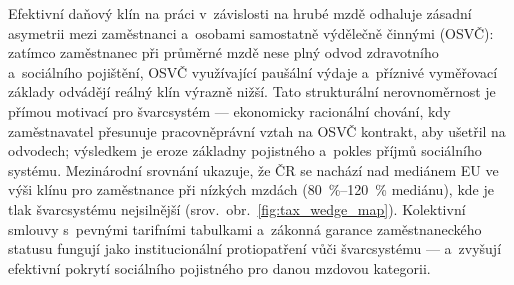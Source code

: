 Efektivní daňový klín na práci v~závislosti na hrubé mzdě odhaluje zásadní asymetrii mezi zaměstnanci a~osobami samostatně výdělečně činnými (\ac{OSVČ}): zatímco zaměstnanec při průměrné mzdě nese plný odvod zdravotního a~sociálního pojištění, \ac{OSVČ} využívající paušální výdaje a~příznivé vyměřovací základy odvádějí reálný klín výrazně nižší.
Tato strukturální nerovnoměrnost je přímou motivací pro švarcsystém --- ekonomicky racionální chování, kdy zaměstnavatel přesunuje pracovněprávní vztah na \ac{OSVČ} kontrakt, aby ušetřil na odvodech; výsledkem je eroze základny pojistného a~pokles příjmů sociálního systému.
Mezinárodní srovnání ukazuje, že ČR se nachází nad mediánem \ac{EU} ve výši klínu pro zaměstnance při nízkých mzdách (\SIrange{80}{120}{\percent} mediánu), kde je tlak švarcsystému nejsilnější (srov.~obr.~\ref{fig:tax_wedge_map}).
Kolektivní smlouvy s~pevnými tarifními tabulkami a~zákonná garance zaměstnaneckého statusu fungují jako institucionální protiopatření vůči švarcsystému --- a~zvyšují efektivní pokrytí sociálního pojistného pro danou mzdovou kategorii.


